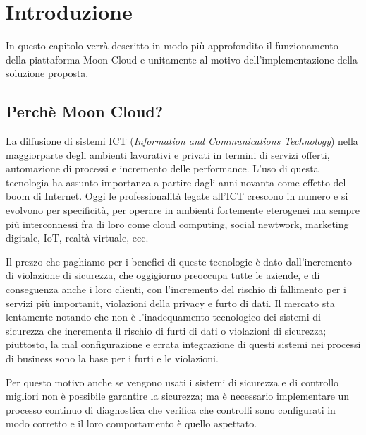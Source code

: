 \chapter{Introduzione}
In questo capitolo verrà descritto in modo più approfondito 
il funzionamento della piattaforma Moon Cloud e unitamente al 
motivo dell'implementazione della soluzione proposta.

\section{Perchè Moon Cloud?}
La diffusione di sistemi ICT (\textit{Information and Communications Technology})
nella maggiorparte degli ambienti lavorativi e privati in termini di servizi offerti,
automazione di processi e incremento delle performance. L'uso di questa tecnologia 
ha assunto importanza a partire dagli anni novanta come effetto del boom di Internet.
Oggi le professionalità legate all'ICT crescono in numero e si evolvono per 
specificità, per operare in ambienti fortemente eterogenei ma sempre più interconnessi 
fra di loro come cloud computing, social newtwork, marketing digitale, IoT, realtà virtuale,
ecc.

Il prezzo che paghiamo per i benefici di queste tecnologie è dato dall'incremento di 
violazione di sicurezza, che oggigiorno preoccupa tutte le aziende, e di conseguenza anche i 
loro clienti, con l'incremento del rischio di fallimento per i servizi più importanit, 
violazioni della privacy e furto di dati.
\newline
Il mercato sta lentamente notando che non è l'inadequamento tecnologico dei sistemi di sicurezza
che incrementa il rischio di furti di dati o violazioni di sicurezza; piuttosto, la mal configurazione
e errata integrazione di questi sistemi nei processi di business sono la base per 
i furti e le violazioni. \cite{cloud-Platform-for-ICT-Security-Governance}

Per questo motivo anche se vengono usati i sistemi di sicurezza e di controllo migliori non è possibile 
garantire la sicurezza; ma è necessario implementare un processo continuo di diagnostica che verifica che 
controlli sono configurati in modo corretto e il loro comportamento è quello aspettato.

